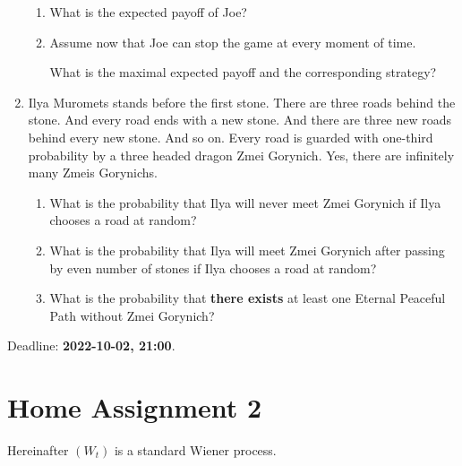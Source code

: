 \documentclass[12pt]{article}
\begin{document}
\begin{enumerate}
\begin{enumerate}
  \item What is the expected payoff of Joe?
  \item Assume now that Joe can stop the game at every moment of time. 
  
  What is the maximal expected payoff and the corresponding strategy?
\end{enumerate}


\item Ilya Muromets stands before the first stone. There are three roads behind the stone. 
And every road ends with a new stone. And there are three new roads behind every new stone. And so on. 
Every road is guarded with one-third probability by a three headed dragon Zmei Gorynich.
Yes, there are infinitely many Zmeis Gorynichs.

\begin{enumerate}
\item What is the probability that Ilya will never meet Zmei Gorynich if Ilya chooses a road at random?
\item What is the probability that Ilya will meet Zmei Gorynich after passing by even number of stones
if Ilya chooses a road at random?
\item What is the probability that \textbf{there exists} at least one Eternal Peaceful Path without Zmei Gorynich?
\end{enumerate}


\end{enumerate}

Deadline: \textbf{2022-10-02, 21:00}. 

\newpage

\section*{Home Assignment 2}

Hereinafter $(W_t)$ is a standard Wiener process.  
\end{document}
